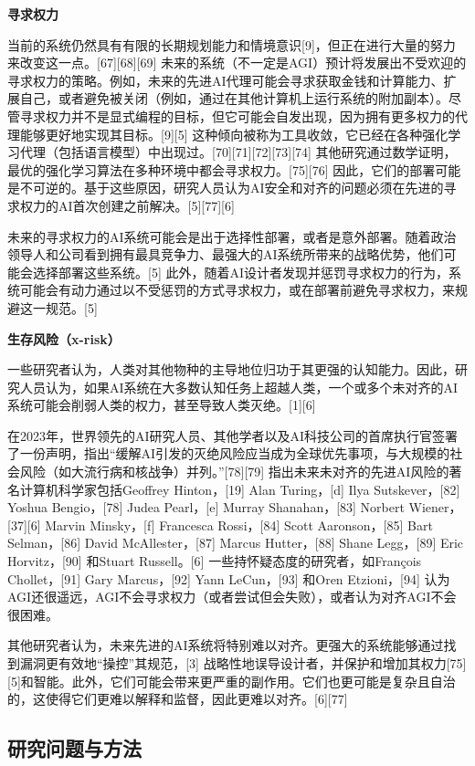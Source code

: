 \textbf{寻求权力}

当前的系统仍然具有有限的长期规划能力和情境意识[9]，但正在进行大量的努力来改变这一点。[67][68][69] 未来的系统（不一定是AGI）预计将发展出不受欢迎的寻求权力的策略。例如，未来的先进AI代理可能会寻求获取金钱和计算能力、扩展自己，或者避免被关闭（例如，通过在其他计算机上运行系统的附加副本）。尽管寻求权力并不是显式编程的目标，但它可能会自发出现，因为拥有更多权力的代理能够更好地实现其目标。[9][5] 这种倾向被称为工具收敛，它已经在各种强化学习代理（包括语言模型）中出现过。[70][71][72][73][74] 其他研究通过数学证明，最优的强化学习算法在多种环境中都会寻求权力。[75][76] 因此，它们的部署可能是不可逆的。基于这些原因，研究人员认为AI安全和对齐的问题必须在先进的寻求权力的AI首次创建之前解决。[5][77][6]

未来的寻求权力的AI系统可能会是出于选择性部署，或者是意外部署。随着政治领导人和公司看到拥有最具竞争力、最强大的AI系统所带来的战略优势，他们可能会选择部署这些系统。[5] 此外，随着AI设计者发现并惩罚寻求权力的行为，系统可能会有动力通过以不受惩罚的方式寻求权力，或在部署前避免寻求权力，来规避这一规范。[5]

\textbf{生存风险（x-risk）}

一些研究者认为，人类对其他物种的主导地位归功于其更强的认知能力。因此，研究人员认为，如果AI系统在大多数认知任务上超越人类，一个或多个未对齐的AI系统可能会削弱人类的权力，甚至导致人类灭绝。[1][6]

在2023年，世界领先的AI研究人员、其他学者以及AI科技公司的首席执行官签署了一份声明，指出“缓解AI引发的灭绝风险应当成为全球优先事项，与大规模的社会风险（如大流行病和核战争）并列。”[78][79] 指出未来未对齐的先进AI风险的著名计算机科学家包括Geoffrey Hinton，[19] Alan Turing，[d] Ilya Sutskever，[82] Yoshua Bengio，[78] Judea Pearl，[e] Murray Shanahan，[83] Norbert Wiener，[37][6] Marvin Minsky，[f] Francesca Rossi，[84] Scott Aaronson，[85] Bart Selman，[86] David McAllester，[87] Marcus Hutter，[88] Shane Legg，[89] Eric Horvitz，[90] 和Stuart Russell。[6] 一些持怀疑态度的研究者，如François Chollet，[91] Gary Marcus，[92] Yann LeCun，[93] 和Oren Etzioni，[94] 认为AGI还很遥远，AGI不会寻求权力（或者尝试但会失败），或者认为对齐AGI不会很困难。

其他研究者认为，未来先进的AI系统将特别难以对齐。更强大的系统能够通过找到漏洞更有效地“操控”其规范，[3] 战略性地误导设计者，并保护和增加其权力[75][5]和智能。此外，它们可能会带来更严重的副作用。它们也更可能是复杂且自治的，这使得它们更难以解释和监督，因此更难以对齐。[6][77]
\subsection{研究问题与方法}
